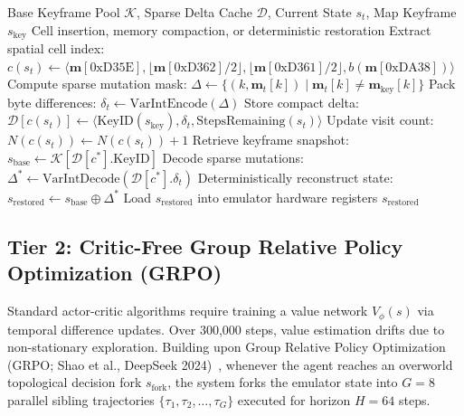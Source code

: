 \documentclass[journal,10pt,twocolumn]{IEEEtran}
\begin{document}
\begin{algorithm}[h]
\caption{Delta-Compressed Keyframing \& Go-Explore State Archiving}
\label{alg:delta_goexplore}
\begin{algorithmic}[1]
\REQUIRE Base Keyframe Pool $\mathcal{K}$, Sparse Delta Cache $\mathcal{D}$, Current State $s_t$, Map Keyframe $s_{\text{key}}$
\ENSURE Cell insertion, memory compaction, or deterministic restoration
\STATE Extract spatial cell index: $c(s_t) \leftarrow \langle \mathbf{m}[\text{0xD35E}], \lfloor \mathbf{m}[\text{0xD362}] / 2 \rfloor, \lfloor \mathbf{m}[\text{0xD361}] / 2 \rfloor, b(\mathbf{m}[\text{0xDA38}]) \rangle$
        \STATE Compute sparse mutation mask: $\Delta \leftarrow \{ (k, \mathbf{m}_t[k]) \mid \mathbf{m}_t[k] \ne \mathbf{m}_{\text{key}}[k] \}$
        \STATE Pack byte differences: $\delta_t \leftarrow \text{VarIntEncode}(\Delta)$
        \STATE Store compact delta: $\mathcal{D}[c(s_t)] \leftarrow \langle \text{KeyID}(s_{\text{key}}), \delta_t, \text{StepsRemaining}(s_t) \rangle$
        \STATE Update visit count: $N(c(s_t)) \leftarrow N(c(s_t)) + 1$
    \ENDIF
{}
    \STATE Retrieve keyframe snapshot: $s_{\text{base}} \leftarrow \mathcal{K}[\mathcal{D}[c^*].\text{KeyID}]$
    \STATE Decode sparse mutations: $\Delta^* \leftarrow \text{VarIntDecode}(\mathcal{D}[c^*].\delta_t)$
    \STATE Deterministically reconstruct state: $s_{\text{restored}} \leftarrow s_{\text{base}} \oplus \Delta^*$
    \STATE Load $s_{\text{restored}}$ into emulator hardware registers
    \RETURN $s_{\text{restored}}$
\ENDIF
\end{algorithmic}
\end{algorithm}

\subsection{Tier 2: Critic-Free Group Relative Policy Optimization (GRPO)}
Standard actor-critic algorithms require training a value network $V_\phi(s)$ via temporal difference updates. Over 300,000 steps, value estimation drifts due to non-stationary exploration. Building upon Group Relative Policy Optimization (GRPO; Shao et al., DeepSeek 2024)~\cite{shao2024deepseekmath}, whenever the agent reaches an overworld topological decision fork $s_{\text{fork}}$, the system forks the emulator state into $G = 8$ parallel sibling trajectories $\{\tau_1, \tau_2, \dots, \tau_G\}$ executed for horizon $H = 64$ steps.
\end{document}
